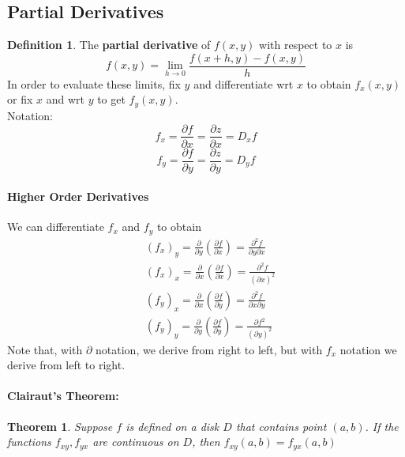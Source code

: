 \documentclass[12 pt]{article}
\newtheorem{thm}{Theorem}
\theoremstyle{definition}
\newtheorem{defn}{Definition}
\begin{document}
\subsection{Partial Derivatives}
\begin{defn}
	The \textbf{partial derivative} of $f(x,y)$ with respect to $x$ is $$f(x,y)=\lim_{h\to 0}\frac{f(x+h,y)-f(x,y)}{h}$$
	In order to evaluate these limits, fix $y$ and differentiate wrt $x$ to obtain $f_x(x,y)$ or fix $x$ and wrt $y$ to get $f_y(x,y)$.
	\\ Notation: $$f_x=\frac{\partial f}{\partial x}=\frac{\partial z}{\partial x}=D_{x}f$$
	$$f_y=\frac{\partial f}{\partial y}=\frac{\partial z}{\partial y}=D_y f$$
\end{defn}
\paragraph{Higher Order Derivatives}
We can differentiate $f_x$ and $f_y$ to obtain
\begin{align*}
	&(f_x)_y=\frac{\partial}{\partial y}\left(\frac{\partial f}{\partial x}\right)=\frac{\partial^2 f}{\partial y \partial x}
	\\&(f_x)_x=\frac{\partial}{\partial x}\left(\frac{\partial f}{\partial x}\right)=\frac{\partial^2 f}{(\partial x)^2}
	\\&(f_y)_x=\frac{\partial}{\partial x}\left(\frac{\partial f}{\partial y}\right)=\frac{\partial^2 f}{\partial x \partial y}
	\\&(f_y)_y=\frac{\partial}{\partial y}\left(\frac{\partial f}{\partial y}\right)=\frac{\partial f^2}{(\partial y)^2}
\end{align*}
Note that, with $\partial$ notation, we derive from right to left, but with $f_x$ notation we derive from left to right.
\paragraph{Clairaut's Theorem:} 
\begin{thm}
	Suppose $f$ is defined on a disk $D$ that contains point $(a,b)$. If the functions $f_{xy},f_{yx}$ are continuous on $D$, then $f_{xy}(a,b)=f_{yx}(a,b)$
\end{thm}
\end{document}
